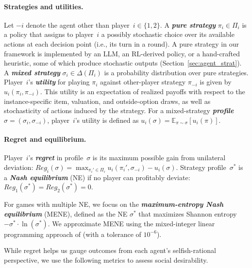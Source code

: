 \documentclass{article}
\theoremstyle{plain}
\theoremstyle{definition}
\theoremstyle{remark}
\newcommand{\term}[1]{\textbf{\textit{#1}}}
\newcommand{\Regret}{\mathit{Reg}}
\begin{document}
\paragraph{Strategies and utilities.} 
Let $-i$ denote the agent other than player~$i\in\{1,2\}$. A \term{pure strategy} \(\pi_i\in\Pi_i\) is a policy that assigns to player~\(i\) a possibly stochastic choice over its available actions at each decision point (i.e., its turn in a round).
A pure strategy in our framework is implemented by an LLM, an RL-derived policy, or a hand-crafted heuristic, some of which produce stochastic outputs (Section~\ref{sec:agent_strat}). 
A \term{mixed strategy} $\sigma_i \in \Delta(\Pi_i)$ is a probability distribution over pure strategies.
Player~$i$'s \term{utility} for playing $\pi_i$ against other-player strategy $\pi_{-i}$ is given by $u_i(\pi_i,\pi_{-i})$.
This utility is an expectation of realized payoffs with respect to the instance-specific item, valuation, and outside-option draws, as well as stochasticity of actions induced by the strategy.
For a mixed-strategy \term{profile} $\sigma = (\sigma_i, \sigma_{-i})$, player~$i$'s utility is defined as $u_i(\sigma) = \mathbb{E}_{\pi \sim \sigma}[u_i(\pi)]$.

\paragraph{Regret and equilibrium.} 
Player~$i$'s \term{regret} in profile~$\sigma$ is its maximum possible gain from unilateral deviation:
$\Regret_i(\sigma) = \max_{\pi_i' \in \Pi_i} u_i(\pi_i', \sigma_{-i}) - u_i(\sigma)$.
Strategy profile~$\sigma^*$ is a \term{Nash equilibrium} (NE) if no player can profitably deviate: $\Regret_1(\sigma^*) = \Regret_2(\sigma^*) =0$.

For games with multiple NE, we focus on the \term{maximum-entropy Nash equilibrium} (MENE), defined as the NE $\sigma^*$ that maximizes Shannon entropy $-\sigma^* \cdot \ln (\sigma^*)$. 
We approximate MENE using the mixed-integer linear programming approach of \citet{li2024meta} (with a tolerance of $10^{-6}$).

 
While regret helps us gauge outcomes from each agent's selfish-rational perspective, we use the following metrics to assess social desirability.
\end{document}

